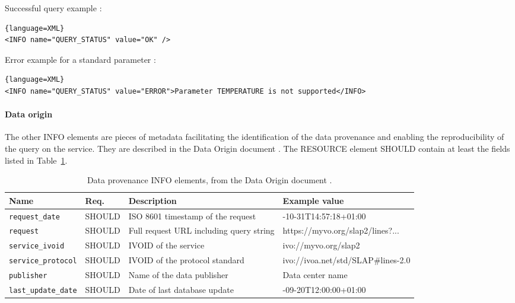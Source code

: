 \documentclass[11pt,a4paper]{ivoa}
\begin{document}
Successful query example :
\begin{lstlisting}{language=XML}
<INFO name="QUERY_STATUS" value="OK" />
\end{lstlisting}

Error example for a standard parameter :
\begin{lstlisting}{language=XML}
<INFO name="QUERY_STATUS" value="ERROR">Parameter TEMPERATURE is not supported</INFO>
\end{lstlisting}


\paragraph{Data origin}\label{par:Data_origin}
The other INFO elements are pieces of metadata facilitating the identification of the data provenance and enabling the
reproducibility of the query on the service. They are described in the Data Origin document \citep{ivoaDataOrigin1.1}.
The RESOURCE element SHOULD contain at least the fields listed in Table~\ref{tab:data-origin-infos}.

\begin{table}[H]
\centering
\begin{tabularx}{\linewidth}{ll>{\raggedright\arraybackslash}X>{\ttfamily\small\raggedright\arraybackslash}X}
\hline
\textbf{Name} & \textbf{Req.} & \textbf{Description} & \textbf{Example value} \\
\hline
\texttt{request\_date}     & SHOULD & ISO 8601 timestamp of the request          & 2025-10-31T14:57:18+01:00 \\
\texttt{request}           & SHOULD & Full request URL including query string     & https://myvo.org/slap2/lines?... \\
\texttt{service\_ivoid}    & SHOULD & IVOID of the service                       & ivo://myvo.org/slap2 \\
\texttt{service\_protocol} & SHOULD & IVOID of the protocol standard             & ivo://ivoa.net/std/SLAP\#lines-2.0 \\
\texttt{publisher}         & SHOULD & Name of the data publisher                 & Data center name \\
\texttt{last\_update\_date}& SHOULD & Date of last database update               & 2025-09-20T12:00:00+01:00 \\
\hline
\end{tabularx}
\caption{Data provenance INFO elements, from the Data Origin document \citep{ivoaDataOrigin1.1}.}
\label{tab:data-origin-infos}
\end{table}
\end{document}
